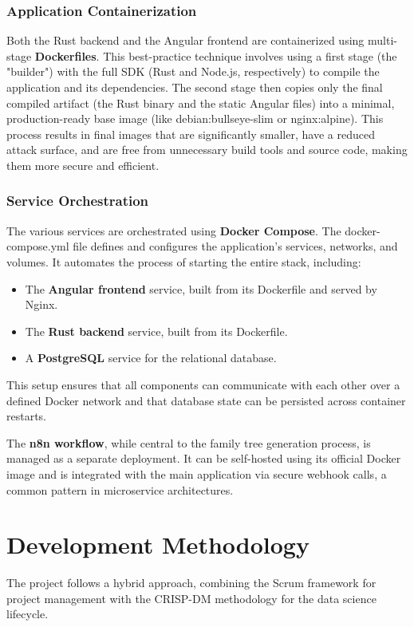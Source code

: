 \subsubsection{Application Containerization}
Both the Rust backend and the Angular frontend are containerized using multi-stage \textbf{Dockerfiles}. This best-practice technique involves using a first stage (the "builder") with the full SDK (Rust and Node.js, respectively) to compile the application and its dependencies. The second stage then copies only the final compiled artifact (the Rust binary and the static Angular files) into a minimal, production-ready base image (like debian:bullseye-slim or nginx:alpine). This process results in final images that are significantly smaller, have a reduced attack surface, and are free from unnecessary build tools and source code, making them more secure and efficient.

\subsubsection{Service Orchestration}
The various services are orchestrated using \textbf{Docker Compose}. The docker-compose.yml file defines and configures the application's services, networks, and volumes. It automates the process of starting the entire stack, including:
\begin{itemize}
    \item The \textbf{Angular frontend} service, built from its Dockerfile and served by Nginx.
    \item The \textbf{Rust backend} service, built from its Dockerfile.
    \item A \textbf{PostgreSQL} service for the relational database.
\end{itemize}
This setup ensures that all components can communicate with each other over a defined Docker network and that database state can be persisted across container restarts.

The \textbf{n8n workflow}, while central to the family tree generation process, is managed as a separate deployment. It can be self-hosted using its official Docker image and is integrated with the main application via secure webhook calls, a common pattern in microservice architectures.

\section{Development Methodology}
The project follows a hybrid approach, combining the Scrum framework for project management with the CRISP-DM methodology for the data science lifecycle.

